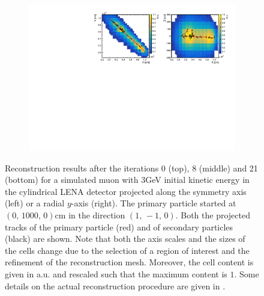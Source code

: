 \begin{figure}[b!t]
\begin{subfigure}[t]{0.99\textwidth}
    \includegraphics[trim=0.1cm 0.1cm 0.0cm 0.1cm,clip=true,width=\textwidth]
      {./recon/RecoResult21.pdf}
  \end{subfigure}
  \caption{Reconstruction results after the iterations 0 (top), 8 (middle) and 21 (bottom) for a 
simulated muon with $3$\unit{GeV} initial kinetic energy in the cylindrical LENA detector projected 
along the symmetry axis (left) or a radial $y$-axis (right). The primary particle started at 
$(0,\,1000,\,0)$\unit{cm} in the direction $(1,\, -1,\, 0)$. Both the projected tracks of the 
primary particle (red) and of secondary particles (black) are shown. Note that both the axis scales 
and the sizes of the cells change due to the selection of a region of interest and the refinement 
of the reconstruction mesh. Moreover, the cell content is given in a.u. and rescaled such that the 
maximum content is $1$. Some details on the actual reconstruction procedure are given in
.
}
  \label{fig:RecoItrResults}
\end{figure}
  
  
  

